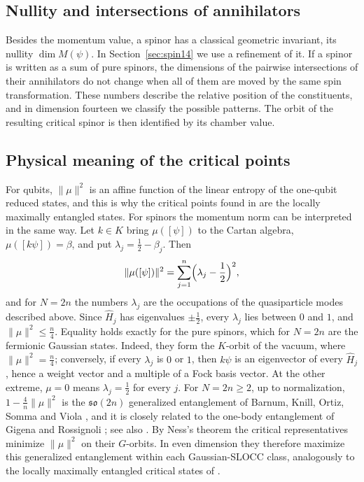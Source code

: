 \documentclass{article}
\theoremstyle{definition}
\theoremstyle{remark}
\newcommand{\norm}[1]{\lVert #1\rVert}
\begin{document}
\subsection{Nullity and intersections of annihilators}
Besides the momentum value, a spinor has a classical geometric
invariant, its nullity $\dim M(\psi)$. In Section~\ref{sec:spin14} we use
a refinement of it. If a spinor is written as a sum of pure spinors, the
dimensions of the pairwise intersections of their annihilators do not
change when all of them are moved by the same spin transformation. These
numbers describe the relative position of the constituents, and in
dimension fourteen we classify the possible patterns. The orbit of the
resulting critical spinor is then identified by its chamber value.

\subsection{Physical meaning of the critical points}
\label{sec:physical-meaning}

For qubits, $\norm\mu^2$ is an affine function of the linear entropy of the
one-qubit reduced states, and this is why the critical points found in
\cite{MaciazekSawicki2015} are the locally maximally entangled states. For
spinors the momentum norm can be interpreted in the same way. Let $k\in K$ bring
$\mu([\psi])$ to the Cartan algebra, $\mu([k\psi])=\beta$, and put
$\lambda_j=\frac12-\beta_j$. Then
\begin{equation}
 \norm{\mu([\psi])}^2=\sum_{j=1}^n\Bigl(\lambda_j-\frac12\Bigr)^2 ,
 \label{eq:momentum-occupations}
\end{equation}
and for $N=2n$ the numbers $\lambda_j$ are the occupations of the
quasiparticle modes described above. Since $\widehat H_j$ has eigenvalues
$\pm\frac12$, every $\lambda_j$ lies between $0$ and $1$, and
$\norm\mu^2\le\frac n4$. Equality holds exactly for the pure spinors, which
for $N=2n$ are the fermionic Gaussian states. Indeed, they form the $K$-orbit of the
vacuum, where $\norm\mu^2=\frac n4$; conversely, if every $\lambda_j$ is $0$ or
$1$, then $k\psi$ is an eigenvector of every $\widehat H_j$, hence a weight
vector and a multiple of a Fock basis vector. At the other extreme, $\mu=0$
means $\lambda_j=\frac12$ for every $j$. For $N=2n\ge2$, up to normalization,
$1-\frac4n\norm\mu^2$ is the $\mathfrak{so}(2n)$ generalized entanglement of
Barnum, Knill, Ortiz, Somma and Viola \cite{BarnumEtAl2004,SommaEtAl2004}, and
it is closely related to the one-body entanglement of Gigena and Rossignoli
\cite{GigenaRossignoli2015}; see also \cite{OszmaniecKus2013}. By Ness's
theorem \cite{Ness1984} the critical representatives minimize
$\norm\mu^2$ on their $G$-orbits. In even dimension they therefore maximize
this generalized entanglement within each Gaussian-SLOCC class, analogously
to the locally maximally entangled critical states of \cite{MaciazekSawicki2015}.
\end{document}
